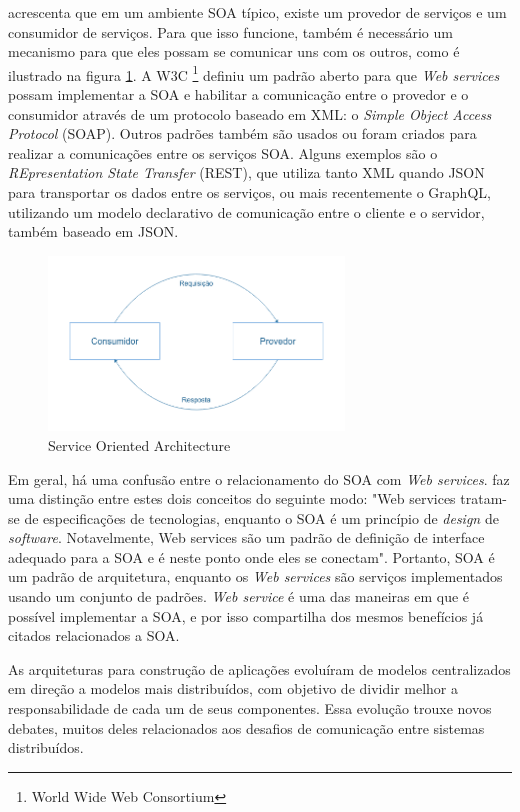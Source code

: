  acrescenta que em um ambiente SOA típico, existe um provedor de serviços e um consumidor de serviços. Para que isso funcione, também é necessário um mecanismo para que eles possam se comunicar uns com os outros, como é ilustrado na figura \ref{fig:soa}. A W3C \footnote{World Wide Web Consortium} definiu um padrão aberto para que \textit{Web services} possam implementar a SOA e habilitar a comunicação entre o provedor e o consumidor através de um protocolo baseado em XML: o \textit{Simple Object Access Protocol} (SOAP). Outros padrões também são usados ou foram criados para realizar a comunicações entre os serviços SOA. Alguns exemplos são o \textit{REpresentation State Transfer} (REST), que utiliza tanto XML quando JSON para transportar os dados entre os serviços, ou mais recentemente o GraphQL, utilizando um modelo declarativo de comunicação entre o cliente e o servidor, também baseado em JSON.

\begin{figure}[htbp]
    \centering
    \includegraphics[width=0.7\textwidth]{figuras/soa.png}
    \caption{Service Oriented Architecture}
    \label{fig:soa}
\end{figure}

Em geral, há uma confusão entre o relacionamento do SOA com \textit{Web services}.  faz uma distinção entre estes dois conceitos do seguinte modo: "Web services tratam-se de especificações de tecnologias, enquanto o SOA é um princípio de \textit{design} de \textit{software}. Notavelmente, Web services são um padrão de definição de interface adequado para a SOA e é neste ponto onde eles se conectam". Portanto, SOA é um padrão de arquitetura, enquanto os \textit{Web services} são serviços implementados usando um conjunto de padrões. \textit{Web service} é uma das maneiras em que é possível implementar a SOA, e por isso compartilha dos mesmos benefícios já citados relacionados a SOA.

As arquiteturas para construção de aplicações evoluíram de modelos centralizados em direção a modelos mais distribuídos, com objetivo de dividir melhor a responsabilidade de cada um de seus componentes. Essa evolução trouxe novos debates, muitos deles relacionados aos desafios de comunicação entre sistemas distribuídos.